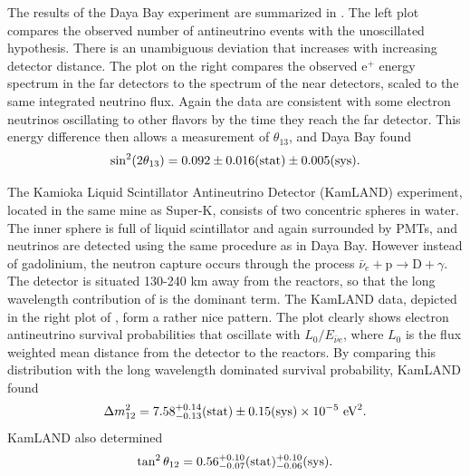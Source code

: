 The results of the Daya Bay experiment are summarized in . 
The left plot compares the observed number of antineutrino events with the
unoscillated hypothesis. There is an unambiguous deviation
that increases with increasing detector distance.
The plot on the right compares the observed e$^+$ energy spectrum in the far
detectors to the spectrum of the near detectors, scaled to the same integrated
neutrino flux. Again the data are consistent with some electron neutrinos
oscillating to other flavors by the time they reach the far detector.
This energy difference then allows a measurement of $\theta_{13}$, and Daya Bay
found \cite{an_observation_2012}
\begin{equation}
  \sin^2(2\theta_{13})=0.092\pm0.016({\rm stat})\pm0.005({\rm sys}).
\end{equation}

The Kamioka Liquid Scintillator Antineutrino Detector (KamLAND) experiment,
located in the same mine as Super-K, consists of two concentric spheres in
water. The inner sphere is full of liquid scintillator and again surrounded by
PMTs, and neutrinos are detected using the same procedure as in Daya Bay.
However instead of gadolinium, the neutron capture occurs through the
process $\bar{\nu}_e+\text{p}\to\text{D}+\gamma$. The detector is situated
130-240 km away from the reactors, so that the long wavelength contribution of
 is the dominant term. The KamLAND data, depicted in the right
plot of , form a rather nice pattern. 
The plot clearly shows electron
antineutrino survival probabilities that oscillate with $L_0/E_{\bar{\nu}e}$,
where $L_0$ is the flux weighted mean distance from the detector to the
reactors. By comparing this distribution with the long wavelength dominated
survival probability, KamLAND found \cite{abe_precision_2008}
\begin{equation}
  \Delta m_{12}^2=7.58^{+0.14}_{-0.13}({\rm stat})
        \pm0.15({\rm sys})\times10^{-5}~\text{eV}^2.
\end{equation}
KamLAND also determined
\begin{equation}
  \tan^2\theta_{12}=0.56^{+0.10}_{-0.07}({\rm stat})^{+0.10}_{-0.06}({\rm sys}).
\end{equation}

